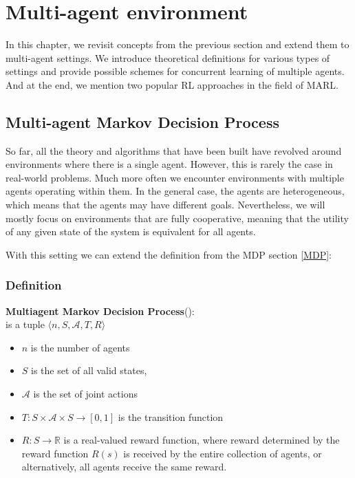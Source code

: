 \chapter{Multi-agent environment}\label{MAS}

In this chapter, we revisit concepts from the previous section and extend them to multi-agent settings.
We introduce theoretical definitions for various types of settings and provide possible schemes for concurrent learning of multiple agents.
And at the end, we mention two popular RL approaches in the field of MARL.

\section{Multi-agent Markov Decision Process}
So far, all the theory and algorithms that have been built have revolved around environments where there is a single agent.
However, this is rarely the case in real-world problems.
Much more often we encounter environments with multiple agents operating within them.
In the general case, the agents are heterogeneous, which means that the agents may have different goals.
Nevertheless, we will mostly focus on environments that are fully cooperative, meaning that the utility of any given state of the system is equivalent for all agents.

With this setting we can extend the definition from the MDP section \ref{MDP}:
\subsection*{Definition}
\textbf{Multiagent Markov Decision Process}(\cite{MMDP}): \\
is a tuple 
$\langle n, S, \mathcal{A}, T, R\rangle$
\begin{itemize}
    \item $n$ is the number of agents
    \item $S$ is the set of all valid states,
    \item $\mathcal{A} $ is the set of joint actions
    \item $T: S \times \mathcal{A} \times S \rightarrow [0,1]$ is the transition function
    \item $R: S  \rightarrow \mathbb{R}$ is a real-valued reward function, where reward determined by the reward function $R(s)$ is received by the entire collection of agents, or alternatively, all agents receive the same reward.

\end{itemize}

